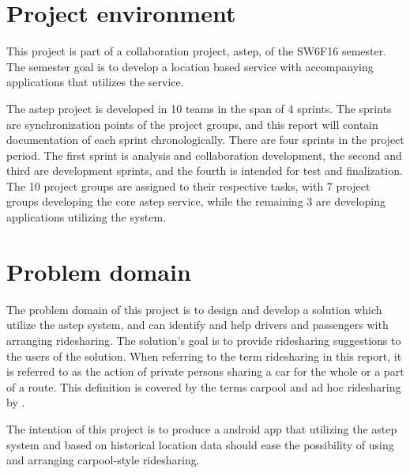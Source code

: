 \section{Project environment}
This project is part of a collaboration project, \gls{astep}, of the SW6F16 semester.
The semester goal is to develop a location based service with accompanying applications that utilizes the service. 

The \gls{astep} project is developed in 10 teams in the span of 4 sprints.
The sprints are synchronization points of the project groups, and this report will contain documentation of each sprint chronologically.
There are four sprints in the project period.
The first sprint is analysis and collaboration development, the second and third are development sprints, and the fourth is intended for test and finalization.
The 10 project groups are assigned to their respective tasks, with 7 project groups developing the core \gls{astep} service, while the remaining 3 are developing applications utilizing the system.



\section{Problem domain}
The problem domain of this project is to design and develop a solution which utilize the \gls{astep} system, and can identify and help drivers and passengers with arranging ridesharing.
The solution's goal is to provide ridesharing suggestions to the users of the solution.
When referring to the term ridesharing in this report, it is referred to as the action of private persons sharing a car for the whole or a part of a route. 
This definition is covered by the terms carpool and ad hoc ridesharing by \citet{doi:10.1080/01441647.2011.621557}.  

The intention of this project is to produce a android app that utilizing the \gls{astep} system and based on historical location data should ease the possibility of using and arranging carpool-style ridesharing.

